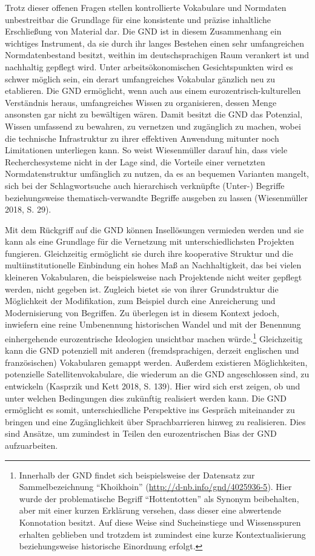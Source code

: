 \documentclass[a4paper,
fontsize=11pt,
oneside,
numbers=noperiodatend,
parskip=half-,
bibliography=totoc,
final
]{scrartcl}
\begin{document}
Trotz dieser offenen Fragen stellen kontrollierte Vokabulare und
Normdaten unbestreitbar die Grundlage für eine konsistente und präzise
inhaltliche Erschließung von Material dar. Die GND ist in diesem
Zusammenhang ein wichtiges Instrument, da sie durch ihr langes Bestehen
einen sehr umfangreichen Normdatenbestand besitzt, weithin im
deutschsprachigen Raum verankert ist und nachhaltig gepflegt wird. Unter
arbeitsökonomischen Gesichtspunkten wird es schwer möglich sein, ein
derart umfangreiches Vokabular gänzlich neu zu etablieren. Die GND
ermöglicht, wenn auch aus einem eurozentrisch-kulturellen Verständnis
heraus, umfangreiches Wissen zu organisieren, dessen Menge ansonsten gar
nicht zu bewältigen wären. Damit besitzt die GND das Potenzial, Wissen
umfassend zu bewahren, zu vernetzen und zugänglich zu machen, wobei die
technische Infrastruktur zu ihrer effektiven Anwendung mitunter noch
Limitationen unterliegen kann. So weist Wiesenmüller darauf hin, dass
viele Recherchesysteme nicht in der Lage sind, die Vorteile einer
vernetzten Normdatenstruktur umfänglich zu nutzen, da es an bequemen
Varianten mangelt, sich bei der Schlagwortsuche auch hierarchisch
verknüpfte (Unter-) Begriffe beziehungsweise thematisch-verwandte
Begriffe ausgeben zu lassen (Wiesenmüller 2018, S. 29).

Mit dem Rückgriff auf die GND können Insellösungen vermieden werden und
sie kann als eine Grundlage für die Vernetzung mit unterschiedlichsten
Projekten fungieren. Gleichzeitig ermöglicht sie durch ihre kooperative
Struktur und die multiinstitutionelle Einbindung ein hohes Maß an
Nachhaltigkeit, das bei vielen kleineren Vokabularen, die beispielsweise
nach Projektende nicht weiter gepflegt werden, nicht gegeben ist.
Zugleich bietet sie von ihrer Grundstruktur die Möglichkeit der
Modifikation, zum Beispiel durch eine Anreicherung und Modernisierung
von Begriffen. Zu überlegen ist in diesem Kontext jedoch, inwiefern eine
reine Umbenennung historischen Wandel und mit der Benennung
einhergehende eurozentrische Ideologien unsichtbar machen
würde.\footnote{Innerhalb der GND findet sich beispielsweise der
  Datensatz zur Sammelbezeichnung \enquote{Khoikhoin}
  (\url{http://d-nb.info/gnd/4025936-5}). Hier wurde der problematische
  Begriff \enquote{Hottentotten} als Synonym beibehalten, aber mit einer
  kurzen Erklärung versehen, dass dieser eine abwertende Konnotation
  besitzt. Auf diese Weise sind Sucheinstiege und Wissensspuren erhalten
  geblieben und trotzdem ist zumindest eine kurze Kontextualisierung
  beziehungsweise historische Einordnung erfolgt.} Gleichzeitig kann die
GND potenziell mit anderen (fremdsprachigen, derzeit englischen und
französischen) Vokabularen gemappt werden. Außerdem existieren
Möglichkeiten, potenzielle Satellitenvokabulare, die wiederum an die GND
angeschlossen sind, zu entwickeln (Kasprzik und Kett 2018, S. 139). Hier
wird sich erst zeigen, ob und unter welchen Bedingungen dies zukünftig
realisiert werden kann. Die GND ermöglicht es somit, unterschiedliche
Perspektive ins Gespräch miteinander zu bringen und eine Zugänglichkeit
über Sprachbarrieren hinweg zu realisieren. Dies sind Ansätze, um
zumindest in Teilen den eurozentrischen Bias der GND aufzuarbeiten.
\end{document}
